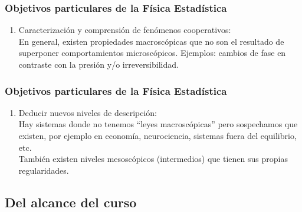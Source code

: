 \documentclass[12pt]{beamer}
\begin{document}
\begin{frame}
\frametitle{Objetivos particulares de la Física Estadística}  
\begin{enumerate}[<+->]
\conti
\item Caracterización y comprensión de fenómenos cooperativos:
\\ \pause
En general, existen propiedades macroscópicas que no son el resultado de superponer comportamientos microscópicos.  \pause Ejemplos: cambios de fase en contraste con la presión y/o irreversibilidad.
\seti
\end{enumerate}
\end{frame}
\begin{frame}
\frametitle{Objetivos particulares de la Física Estadística}  
\begin{enumerate}[<+->]
\conti
\item Deducir nuevos niveles de descripción:
\\ \pause
Hay sistemas donde no tenemos \enquote{leyes macroscópicas} \pause pero sospechamos que existen, \pause por ejemplo en economía, neurociencia, sistemas fuera del equilibrio, etc.
\\ \pause
También existen niveles mesoscópicos (intermedios) que tienen sus propias regularidades.
\end{enumerate}
\end{frame}

\subsection{Del alcance del curso}
\end{document}
